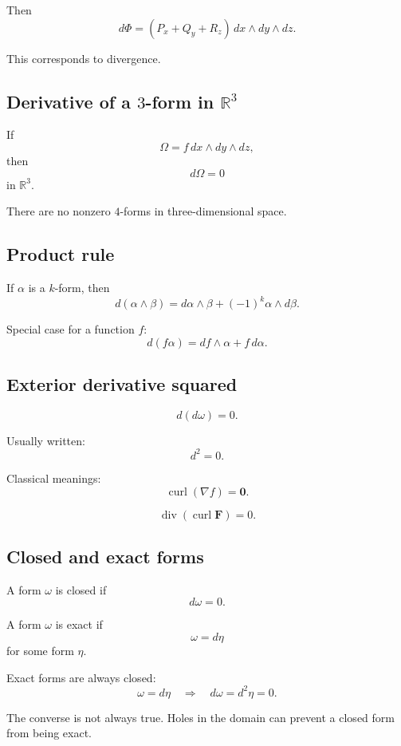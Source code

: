 Then
\[
\boxed{
    d\Phi
    =
    (P_x+Q_y+R_z)\,dx\wedge dy\wedge dz.
}
\]

This corresponds to divergence.

\subsection*{Derivative of a \texorpdfstring{\(3\)}{3}-form in \(\mathbb R^3\)}

If
\[
    \Omega=f\,dx\wedge dy\wedge dz,
\]
then
\[
\boxed{
    d\Omega=0
}
\]
in \(\mathbb R^3\).

There are no nonzero \(4\)-forms in three-dimensional space.

\subsection*{Product rule}

If \(\alpha\) is a \(k\)-form, then
\[
\boxed{
    d(\alpha\wedge\beta)
    =
    d\alpha\wedge\beta
    +
    (-1)^k\alpha\wedge d\beta.
}
\]

Special case for a function \(f\):
\[
\boxed{
    d(f\alpha)=df\wedge\alpha+f\,d\alpha.
}
\]

\subsection*{Exterior derivative squared}

\[
\boxed{
    d(d\omega)=0.
}
\]

Usually written:
\[
\boxed{
    d^2=0.
}
\]

Classical meanings:
\[
\boxed{
    \operatorname{curl}(\nabla f)=\mathbf 0.
}
\]

\[
\boxed{
    \operatorname{div}(\operatorname{curl}\mathbf F)=0.
}
\]

\subsection*{Closed and exact forms}

A form \(\omega\) is closed if
\[
\boxed{
    d\omega=0.
}
\]

A form \(\omega\) is exact if
\[
\boxed{
    \omega=d\eta
}
\]
for some form \(\eta\).

Exact forms are always closed:
\[
\boxed{
    \omega=d\eta
    \quad\Longrightarrow\quad
    d\omega=d^2\eta=0.
}
\]

The converse is not always true.  Holes in the domain can prevent a closed form from
being exact.

